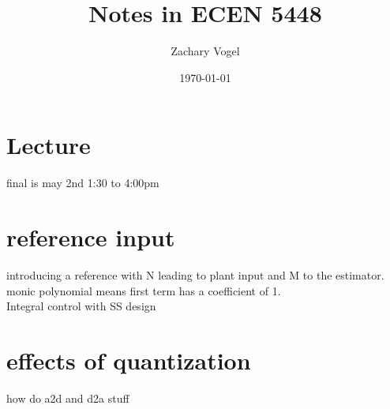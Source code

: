 \documentclass{article}
\author{Zachary Vogel}
\date{\today}
\title{Notes in ECEN 5448}
\begin{document}
\maketitle


\section*{Lecture}
final is may 2nd 1:30 to 4:00pm\\

\section*{reference input}
introducing a reference with N leading to plant input and M to the estimator.\\
monic polynomial means first term has a coefficient of 1.\\
Integral control with SS design\\

\section*{effects of quantization}
how do a2d and d2a stuff\\
\end{document}
